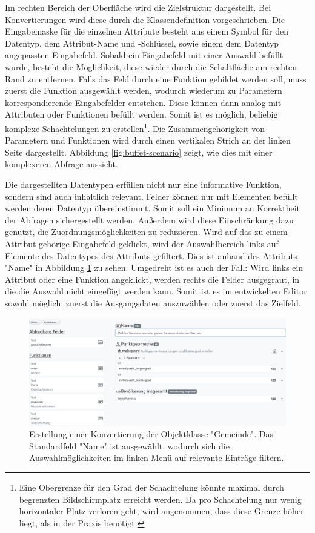Im rechten Bereich der Oberfläche wird die Zielstruktur dargestellt. Bei Konvertierungen wird diese durch die Klassendefinition vorgeschrieben. Die Eingabemaske für die einzelnen Attribute besteht aus einem Symbol für den Datentyp, dem Attribut-Name und -Schlüssel, sowie einem dem Datentyp angepassten Eingabefeld. Sobald ein Eingabefeld mit einer Auswahl befüllt wurde, besteht die Möglichkeit, diese wieder durch die Schaltfläche am rechten Rand zu entfernen. Falls das Feld durch eine Funktion gebildet werden soll, muss zuerst die Funktion ausgewählt werden, wodurch wiederum zu Parametern korrespondierende Eingabefelder entstehen. Diese können dann analog mit Attributen oder Funktionen befüllt werden. Somit ist es möglich, beliebig komplexe Schachtelungen zu erstellen\footnote{Eine Obergrenze für den Grad der Schachtelung könnte maximal durch begrenzten Bildschirmplatz erreicht werden. Da pro Schachtelung nur wenig horizontaler Platz verloren geht, wird angenommen, dass diese Grenze höher liegt, als in der Praxis benötigt.}. Die Zusammengehörigkeit von Parametern und Funktionen wird durch einen vertikalen Strich an der linken Seite dargestellt. Abbildung \ref{fig:buffet-scenario} zeigt, wie dies mit einer komplexeren Abfrage aussieht.

\pskip
Die dargestellten Datentypen erfüllen nicht nur eine informative Funktion, sondern sind auch inhaltlich relevant. Felder können nur mit Elementen befüllt werden deren Datentyp übereinstimmt. Somit soll ein Minimum an Korrektheit der Abfragen sichergestellt werden. Außerdem wird diese Einschränkung dazu genutzt, die Zuordnungsmöglichkeiten zu reduzieren. Wird auf das zu einem Attribut gehörige Eingabefeld geklickt, wird der Auswahlbereich links auf Elemente des Datentypes des Attributs gefiltert. Dies ist anhand des Attributs "Name" in Abbildung \ref{fig:buffet-selected} zu sehen. Umgedreht ist es auch der Fall: Wird links ein Attribut oder eine Funktion angeklickt, werden rechts die Felder ausgegraut, in die die Auswahl nicht eingefügt werden kann. Somit ist es im entwickelten Editor sowohl möglich, zuerst die Ausgangsdaten auszuwählen oder zuerst das Zielfeld.

\begin{figure}[ht]
  \begin{center}
    \includegraphics[width=.95\textwidth]{assets/buffet-selected.png}
  \end{center}
  \caption[Erstellung einer Konvertierung im Block-Editor mit aktivem Typfilter]{Erstellung einer Konvertierung der Objektklasse "Gemeinde". Das Standardfeld "Name" ist ausgewählt, wodurch sich die Auswahlmöglichkeiten im linken Menü auf relevante Einträge filtern.}
  \label{fig:buffet-selected}
\end{figure}

